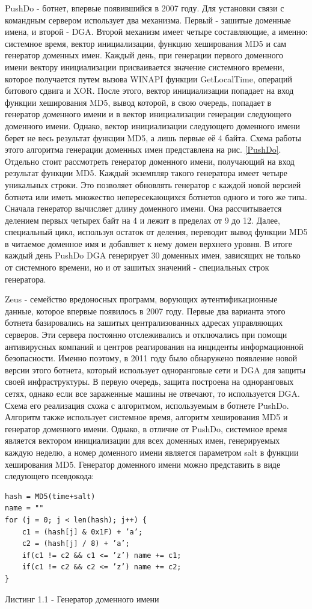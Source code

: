 PushDo - ботнет, впервые появившийся в 2007 году. Для установки связи с командным сервером использует два механизма. Первый - зашитые доменные имена, и второй - DGA. Второй механизм имеет четыре составляющие, а именно: системное время, вектор инициализации, функцию хеширования MD5 и сам генератор доменных имен. Каждый день, при генерации первого доменного имени вектору инициализации присваивается значение системного времени, которое получается путем вызова WINAPI функции GetLocalTime, операций битового сдвига и XOR. После этого, вектор инициализации попадает на вход функции хеширования MD5, вывод которой, в свою очередь, попадает в генератор доменного имени и в вектор инициализации генерации следующего доменного имени. Однако, вектор инициализации следующего доменного имени берет не весь результат функции MD5, а лишь первые её 4 байта. Схема работы этого алгоритма генерации доменных имен представлена на рис. \ref{PushDo}.
Отдельно стоит рассмотреть генератор доменного имени, получающий на вход результат функции MD5. Каждый экземпляр такого генератора имеет четыре уникальных строки. Это позволяет обновлять генератор с каждой новой версией ботнета или иметь множество непересекающихся ботнетов одного и того же типа. Сначала генератор вычисляет длину доменного имени. Она рассчитывается делением первых четырех байт на 4 и лежит в пределах от 9 до 12. Далее, специальный цикл, используя остаток от деления, переводит вывод функции MD5 в читаемое доменное имя и добавляет к нему домен верхнего уровня. В итоге каждый день PushDo DGA генерирует 30 доменных имен, зависящих не только от системного времени, но и от зашитых значений - специальных строк генератора.

Zeus - семейство вредоносных программ, ворующих аутентификационные данные, которое впервые появилось в 2007 году. Первые два варианта этого ботнета базировались на зашитых централизованных адресах управляющих серверов. Эти сервера постоянно отслеживались и отключались при помощи антивирусных компаний и центров реагирования на инциденты информационной безопасности. Именно поэтому, в 2011 году было обнаружено появление новой версии этого ботнета, который использует одноранговые сети и DGA для защиты своей инфраструктуры. В первую очередь, защита построена на одноранговых сетях, однако если все зараженные машины не отвечают, то используется DGA. Схема его реализация схожа с алгоритмом, используемым в ботнете PushDo. Алгоритм также использует системное время, алгоритм хеширования MD5 и генератор доменного имени. Однако, в отличие от PushDo, системное время является вектором инициализации для всех доменных имен, генерируемых каждую неделю, а номер доменного имени является параметром salt в функции хеширования MD5. Генератор доменного имени можно представить в виде следующего псевдокода:
\clearpage
\begin{lstlisting}
hash = MD5(time+salt)
name = ""
for (j = 0; j < len(hash); j++) {
    c1 = (hash[j] & 0x1F) + ’a’;
    c2 = (hash[j] / 8) + ’a’;
    if(c1 != c2 && c1 <= ’z’) name += c1;
    if(c1 != c2 && c2 <= ’z’) name += c2;
}
\end{lstlisting}
Листинг 1.1 - Генератор доменного имени

